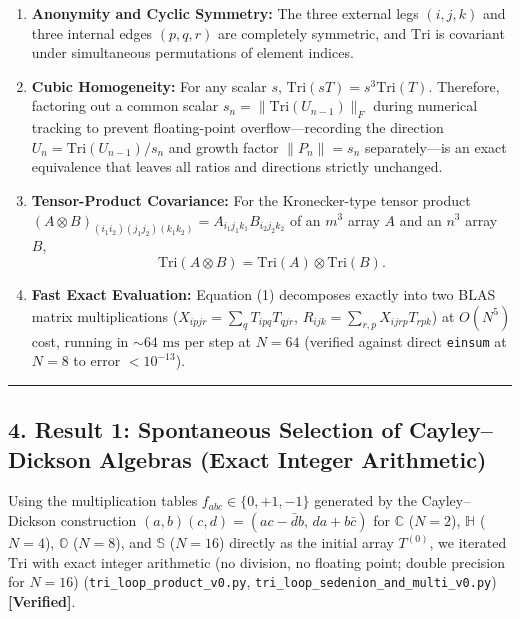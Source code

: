 \documentclass[
  a4paper,
]{article}
\providecommand{\tightlist}{%
  \setlength{\itemsep}{0pt}\setlength{\parskip}{0pt}}
\begin{document}
\begin{enumerate}
\def\labelenumi{\arabic{enumi}.}
\tightlist
\item
  \textbf{Anonymity and Cyclic Symmetry:} The three external legs
  \((i, j, k)\) and three internal edges \((p, q, r)\) are completely
  symmetric, and \(\mathrm{Tri}\) is covariant under simultaneous
  permutations of element indices.
\item
  \textbf{Cubic Homogeneity:} For any scalar \(s\),
  \(\mathrm{Tri}(s T) = s^3 \mathrm{Tri}(T)\). Therefore, factoring out
  a common scalar \(s_n = \|\mathrm{Tri}(U_{n-1})\|_F\) during numerical
  tracking to prevent floating-point overflow---recording the direction
  \(U_n = \mathrm{Tri}(U_{n-1}) / s_n\) and growth factor
  \(\|P_n\| = s_n\) separately---is an exact equivalence that leaves all
  ratios and directions strictly unchanged.
\item
  \textbf{Tensor-Product Covariance:} For the Kronecker-type tensor
  product
  \((A \otimes B)_{(i_1 i_2)(j_1 j_2)(k_1 k_2)} = A_{i_1 j_1 k_1} B_{i_2 j_2 k_2}\)
  of an \(m^3\) array \(A\) and an \(n^3\) array \(B\),
  \[\mathrm{Tri}(A \otimes B) = \mathrm{Tri}(A) \otimes \mathrm{Tri}(B). \tag{2}\]
\item
  \textbf{Fast Exact Evaluation:} Equation (1) decomposes exactly into
  two BLAS matrix multiplications
  (\(X_{ipjr} = \sum_q T_{ipq} T_{qjr}\),
  \(R_{ijk} = \sum_{r,p} X_{ijrp} T_{rpk}\)) at \(O(N^5)\) cost, running
  in \(\sim 64\text{ ms}\) per step at \(N = 64\) (verified against
  direct \texttt{einsum} at \(N = 8\) to error \(< 10^{-13}\)).
\end{enumerate}

\begin{center}\rule{0.5\linewidth}{0.5pt}\end{center}

\subsection{4. Result 1: Spontaneous Selection of Cayley--Dickson
Algebras (Exact Integer
Arithmetic)}\label{result-1-spontaneous-selection-of-cayleydickson-algebras-exact-integer-arithmetic}

Using the multiplication tables \(f_{abc} \in \{0, +1, -1\}\) generated
by the Cayley--Dickson construction
\((a,b)(c,d) = (ac - \bar{d}b,\, da + b\bar{c})\) for \(\mathbb{C}\)
(\(N=2\)), \(\mathbb{H}\) (\(N=4\)), \(\mathbb{O}\) (\(N=8\)), and
\(\mathbb{S}\) (\(N=16\)) directly as the initial array \(T^{(0)}\), we
iterated \(\mathrm{Tri}\) with exact integer arithmetic (no division, no
floating point; double precision for \(N = 16\))
(\texttt{tri\_\allowbreak{}loop\_\allowbreak{}product\_\allowbreak{}v0.py},
\texttt{tri\_\allowbreak{}loop\_\allowbreak{}sedenion\_\allowbreak{}and\_\allowbreak{}multi\_\allowbreak{}v0.py})
\textbf{{[}Verified{]}}.
\end{document}
